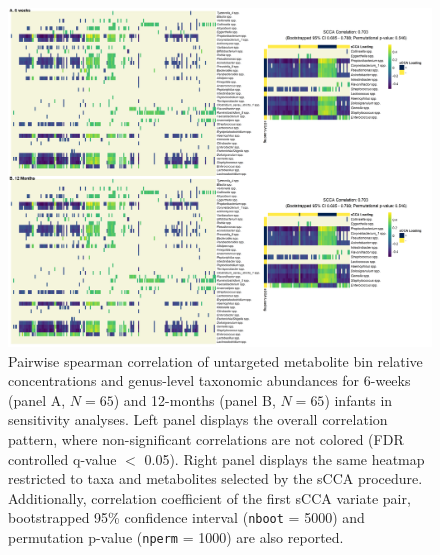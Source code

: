 \begin{figure}[!h]
    \centering
    \includegraphics[width=0.95\linewidth]{figures/appB_fs8.png}
    \caption[Pairwise spearman correlation of untargeted metabolite bin relative concentrations and genus-level taxonomic abundances for 6-weeks (panel A, $N = 65$) and 12-months (panel B, $N = 65$) infants in sensitivity analyses]{Pairwise spearman correlation of untargeted metabolite bin relative concentrations and genus-level taxonomic abundances for 6-weeks (panel A, $N = 65$) and 12-months (panel B, $N = 65$) infants in sensitivity analyses. Left panel displays the overall correlation pattern, where non-significant correlations are not colored (FDR controlled q-value $<$ 0.05). Right panel displays the same heatmap restricted to taxa and metabolites selected by the sCCA procedure. Additionally, correlation coefficient of the first sCCA variate pair, bootstrapped 95\% confidence interval (\texttt{nboot} = 5000) and permutation p-value (\texttt{nperm} = 1000) are also reported.}
    \label{fig:b8}
\end{figure}

